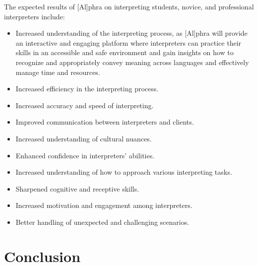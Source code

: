 \documentclass[output=paper]{langscibook}
\begin{document}
The expected results of [Al]phra on interpreting students, novice, and professional interpreters include:

\begin{itemize}
\item Increased understanding of the interpreting process, as [Al]phra will provide an interactive and engaging platform where interpreters can practice their skills in an accessible and safe environment and gain insights on how to recognize and appropriately convey meaning across languages and effectively manage time and resources.
\item Increased efficiency in the interpreting process.
\item Increased accuracy and speed of interpreting.
\item Improved communication between interpreters and clients.
\item Increased understanding of cultural nuances.
\item Enhanced confidence in interpreters' abilities.
\item Increased understanding of how to approach various interpreting tasks.
\item Sharpened cognitive and receptive skills.
\item Increased motivation and engagement among interpreters.
\item Better handling of unexpected and challenging scenarios.
\end{itemize}
\section{Conclusion}
\end{document}
